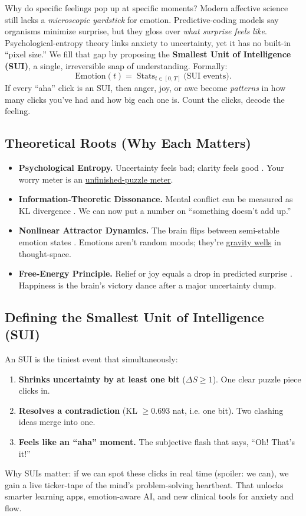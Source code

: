 \documentclass[12pt,a4paper]{article}
\begin{document}
Why do specific feelings pop up at specific moments? Modern affective science still lacks a \emph{microscopic yardstick} for emotion. Predictive-coding models say organisms minimize surprise, but they gloss over \emph{what surprise feels like}. Psychological-entropy theory links anxiety to uncertainty, yet it has no built-in “pixel size.” We fill that gap by proposing the \textbf{Smallest Unit of Intelligence (SUI)}, a single, irreversible snap of understanding. Formally:
\begin{equation}
  \text{Emotion}(t) = \operatorname{Stats}_{t \in [0,T]}\bigl(\text{SUI events}\bigr).
\end{equation}
If every “aha” click is an SUI, then anger, joy, or awe become \emph{patterns} in how many clicks you’ve had and how big each one is. Count the clicks, decode the feeling.

\subsection{Theoretical Roots (Why Each Matters)}
\begin{itemize}[leftmargin=*]
  \item \textbf{Psychological Entropy.} Uncertainty feels bad; clarity feels good \cite{Hirsh2012}. Your worry meter is an \underline{unfinished-puzzle meter}.
  \item \textbf{Information-Theoretic Dissonance.} Mental conflict can be measured as KL divergence \cite{Smaldino2023}. We can now put a number on “something doesn’t add up.”
  \item \textbf{Nonlinear Attractor Dynamics.} The brain flips between semi-stable emotion states \cite{Tognoli2014}. Emotions aren’t random moods; they’re \underline{gravity wells} in thought-space.
  \item \textbf{Free-Energy Principle.} Relief or joy equals a drop in predicted surprise \cite{Friston2024}. Happiness is the brain’s victory dance after a major uncertainty dump.
\end{itemize}

\subsection{Defining the Smallest Unit of Intelligence (SUI)}
An SUI is the tiniest event that simultaneously:
\begin{enumerate}[leftmargin=*]
  \item \textbf{Shrinks uncertainty by at least one bit} ($\Delta S \ge 1$). One clear puzzle piece clicks in.
  \item \textbf{Resolves a contradiction} (KL $\ge 0.693$ nat, i.e. one bit). Two clashing ideas merge into one.
  \item \textbf{Feels like an “aha” moment.} The subjective flash that says, ``Oh! That's it!''
\end{enumerate}
Why SUIs matter: if we can spot these clicks in real time (spoiler: we can), we gain a live ticker-tape of the mind’s problem-solving heartbeat. That unlocks smarter learning apps, emotion-aware AI, and new clinical tools for anxiety and flow.
\end{document}
